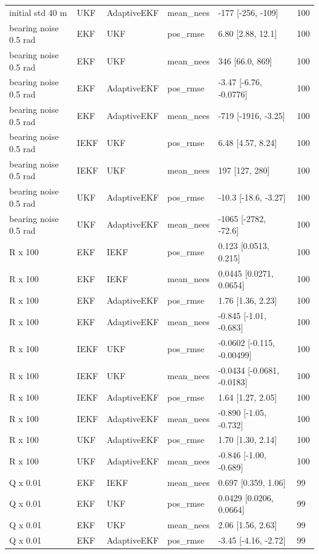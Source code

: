 {\begin{longtable}{llllll}
initial std 40 m & UKF & AdaptiveEKF & mean\_nees & -177 [-256, -109] & 100 \\
bearing noise 0.5 rad & EKF & UKF & pos\_rmse & 6.80 [2.88, 12.1] & 100 \\
bearing noise 0.5 rad & EKF & UKF & mean\_nees & 346 [66.0, 869] & 100 \\
bearing noise 0.5 rad & EKF & AdaptiveEKF & pos\_rmse & -3.47 [-6.76, -0.0776] & 100 \\
bearing noise 0.5 rad & EKF & AdaptiveEKF & mean\_nees & -719 [-1916, -3.25] & 100 \\
bearing noise 0.5 rad & IEKF & UKF & pos\_rmse & 6.48 [4.57, 8.24] & 100 \\
bearing noise 0.5 rad & IEKF & UKF & mean\_nees & 197 [127, 280] & 100 \\
bearing noise 0.5 rad & UKF & AdaptiveEKF & pos\_rmse & -10.3 [-18.6, -3.27] & 100 \\
bearing noise 0.5 rad & UKF & AdaptiveEKF & mean\_nees & -1065 [-2782, -72.6] & 100 \\
R x 100 & EKF & IEKF & pos\_rmse & 0.123 [0.0513, 0.215] & 100 \\
R x 100 & EKF & IEKF & mean\_nees & 0.0445 [0.0271, 0.0654] & 100 \\
R x 100 & EKF & AdaptiveEKF & pos\_rmse & 1.76 [1.36, 2.23] & 100 \\
R x 100 & EKF & AdaptiveEKF & mean\_nees & -0.845 [-1.01, -0.683] & 100 \\
R x 100 & IEKF & UKF & pos\_rmse & -0.0602 [-0.115, -0.00499] & 100 \\
R x 100 & IEKF & UKF & mean\_nees & -0.0434 [-0.0681, -0.0183] & 100 \\
R x 100 & IEKF & AdaptiveEKF & pos\_rmse & 1.64 [1.27, 2.05] & 100 \\
R x 100 & IEKF & AdaptiveEKF & mean\_nees & -0.890 [-1.05, -0.732] & 100 \\
R x 100 & UKF & AdaptiveEKF & pos\_rmse & 1.70 [1.30, 2.14] & 100 \\
R x 100 & UKF & AdaptiveEKF & mean\_nees & -0.846 [-1.00, -0.689] & 100 \\
Q x 0.01 & EKF & IEKF & mean\_nees & 0.697 [0.359, 1.06] & 99 \\
Q x 0.01 & EKF & UKF & pos\_rmse & 0.0429 [0.0206, 0.0664] & 99 \\
Q x 0.01 & EKF & UKF & mean\_nees & 2.06 [1.56, 2.63] & 99 \\
Q x 0.01 & EKF & AdaptiveEKF & pos\_rmse & -3.45 [-4.16, -2.72] & 99 \\

\end{longtable}}
